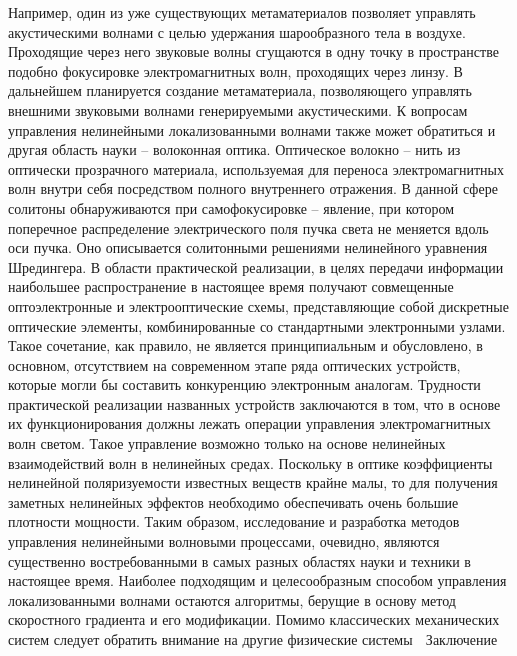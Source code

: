 Например, один из уже существующих метаматериалов позволяет управлять акустическими волнами с целью удержания шарообразного тела в воздухе. Проходящие через него звуковые волны сгущаются в одну точку в пространстве подобно фокусировке электромагнитных волн, проходящих через линзу. В дальнейшем планируется создание метаматериала, позволяющего управлять внешними звуковыми волнами генерируемыми акустическими.
К вопросам управления нелинейными локализованными волнами также может обратиться и другая область науки – волоконная оптика. Оптическое волокно – нить из оптически прозрачного материала, используемая для переноса электромагнитных волн внутри себя посредством полного внутреннего отражения. В данной сфере солитоны обнаруживаются при самофокусировке – явление, при котором поперечное распределение электрического поля пучка света не меняется вдоль оси пучка. Оно описывается солитонными решениями нелинейного уравнения Шредингера. 
В области практической реализации, в целях передачи информации наибольшее распространение в настоящее время получают совмещенные оптоэлектронные и электрооптические схемы, представляющие собой дискретные оптические элементы, комбинированные со стандартными электронными узлами. Такое сочетание, как правило, не является принципиальным и обусловлено, в основном, отсутствием на современном этапе ряда оптических устройств, которые могли бы составить конкуренцию электронным аналогам. Трудности практической реализации названных устройств заключаются в том, что в основе их функционирования должны лежать операции управления электромагнитных волн светом. Такое управление возможно только на основе нелинейных взаимодействий волн в нелинейных средах. Поскольку в оптике коэффициенты нелинейной поляризуемости известных веществ крайне малы, то для получения заметных нелинейных эффектов необходимо обеспечивать очень большие плотности мощности.
Таким образом, исследование и разработка методов управления нелинейными волновыми процессами, очевидно, являются существенно востребованными в самых разных областях науки и техники в настоящее время. Наиболее подходящим и целесообразным способом управления локализованными волнами остаются алгоритмы, берущие в основу метод скоростного градиента и его модификации. Помимо классических механических систем следует обратить внимание на другие физические системы  
Заключение

